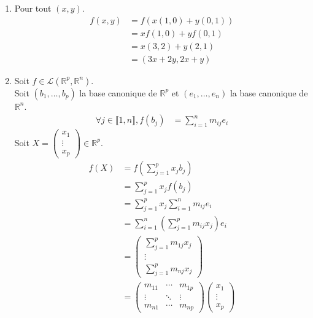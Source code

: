 \documentclass[../main.tex]{subfiles}
\begin{document}
\begin{enumerate}
    \item Pour tout $(x, y)$. 
    \begin{align*}
        f(x, y) &= f(x(1, 0) + y(0, 1)) \\
        &= xf(1, 0) + yf(0, 1) \\
        &= x(3, 2) + y(2, 1) \\
        &= (3x + 2y, 2x + y)
    \end{align*}

    \item Soit $f\in \mathcal{L}(\mathbb{R}^p, \mathbb{R}^n)$. \\
    Soit $(b_1, \ldots, b_p)$ la base canonique de $\mathbb{R}^p$ et $(e_1, \ldots, e_n)$ la base canonique de $\mathbb{R}^n$. \\
    \begin{align*}
        \forall j \in \llbracket 1, n \rrbracket, f(b_j) &= \sum_{i=1}^n m_{ij} e_i
    \end{align*}
    Soit $X = \begin{pmatrix}
        x_1 \\
        \vdots \\
        x_p
    \end{pmatrix} \in \mathbb{R}^p$. \\
    \begin{align*}
        f(X) &= f\left(\sum_{j=1}^p x_j b_j\right) \\
        &= \sum_{j=1}^p x_j f(b_j) \\
        &= \sum_{j=1}^p x_j \sum_{i=1}^n m_{ij} e_i \\
        &= \sum_{i=1}^n \left(\sum_{j=1}^p m_{ij} x_j\right) e_i \\
        &= \begin{pmatrix}
            \sum\limits_{j=1}^p m_{1j} x_j \\
            \vdots \\
            \sum\limits_{j=1}^p m_{nj} x_j
        \end{pmatrix} \\
        &= \begin{pmatrix}
            m_{11} & \cdots & m_{1p} \\
            \vdots & \ddots & \vdots \\
            m_{n1} & \cdots & m_{np}
        \end{pmatrix} \begin{pmatrix}
            x_1 \\
            \vdots \\
            x_p
        \end{pmatrix}
    \end{align*}
\end{enumerate}
\end{document}
